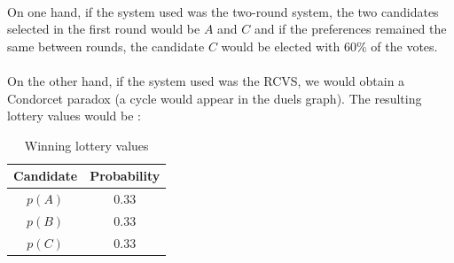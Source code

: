 \paragraph{}
On one hand, if the system used was the two-round system, the two candidates selected in the first round would be $A$ and $C$ and if the preferences remained the same between rounds, the candidate $C$ would be elected with $60\%$ of the votes.
\paragraph{}
On the other hand, if the system used was the RCVS, we would obtain a Condorcet paradox (a cycle would appear in the duels graph). The resulting lottery values would be :

\begin{table}[!h]
\centering
\begin{tabular}{|c|c|}
\hline
Candidate & Probability   \\ \hline
$p(A)$    & $0.33$ \\ \hline
$p(B)$    & $0.33$ \\ \hline
$p(C)$    & $0.33$ \\ \hline
\end{tabular}
\caption{Winning lottery values}
\label{tab:prob_q1.5}
\end{table}